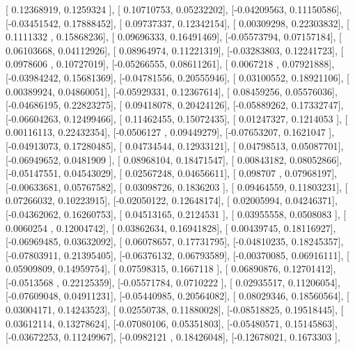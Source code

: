 \documentclass{article}
\begin{document}
       [ 0.12368919,  0.1259324 ],
       [ 0.10710753,  0.05232202],
       [-0.04209563,  0.11150586],
       [-0.03451542,  0.17888452],
       [ 0.09737337,  0.12342154],
       [ 0.00309298,  0.22303832],
       [ 0.1111332 ,  0.15868236],
       [ 0.09696333,  0.16491469],
       [-0.05573794,  0.07157184],
       [ 0.06103668,  0.04112926],
       [ 0.08964974,  0.11221319],
       [-0.03283803,  0.12241723],
       [ 0.0978606 ,  0.10727019],
       [-0.05266555,  0.08611261],
       [ 0.0067218 ,  0.07921888],
       [-0.03984242,  0.15681369],
       [-0.04781556,  0.20555946],
       [ 0.03100552,  0.18921106],
       [ 0.00389924,  0.04860051],
       [-0.05929331,  0.12367614],
       [ 0.08459256,  0.05576036],
       [-0.04686195,  0.22823275],
       [ 0.09418078,  0.20424126],
       [-0.05889262,  0.17332747],
       [-0.06604263,  0.12499466],
       [ 0.11462455,  0.15072435],
       [ 0.01247327,  0.1214053 ],
       [ 0.00116113,  0.22432354],
       [-0.0506127 ,  0.09449279],
       [-0.07653207,  0.1621047 ],
       [-0.04913073,  0.17280485],
       [ 0.04734544,  0.12933121],
       [ 0.04798513,  0.05087701],
       [-0.06949652,  0.0481909 ],
       [ 0.08968104,  0.18471547],
       [ 0.00843182,  0.08052866],
       [-0.05147551,  0.04543029],
       [ 0.02567248,  0.04656611],
       [ 0.098707  ,  0.07968197],
       [-0.00633681,  0.05767582],
       [ 0.03098726,  0.1836203 ],
       [ 0.09464559,  0.11803231],
       [ 0.07266032,  0.10223915],
       [-0.02050122,  0.12648174],
       [ 0.02005994,  0.04246371],
       [-0.04362062,  0.16260753],
       [ 0.04513165,  0.2124531 ],
       [ 0.03955558,  0.0508083 ],
       [ 0.0060254 ,  0.12004742],
       [ 0.03862634,  0.16941828],
       [ 0.00439745,  0.18116927],
       [-0.06969485,  0.03632092],
       [ 0.06078657,  0.17731795],
       [-0.04810235,  0.18245357],
       [-0.07803911,  0.21395405],
       [-0.06376132,  0.06793589],
       [-0.00370085,  0.06916111],
       [ 0.05909809,  0.14959754],
       [ 0.07598315,  0.1667118 ],
       [ 0.06890876,  0.12701412],
       [-0.0513568 ,  0.22125359],
       [-0.05571784,  0.0710222 ],
       [ 0.02935517,  0.11206054],
       [-0.07609048,  0.04911231],
       [-0.05440985,  0.20564082],
       [ 0.08029346,  0.18560564],
       [ 0.03004171,  0.14243523],
       [ 0.02550738,  0.11880028],
       [-0.08518825,  0.19518445],
       [ 0.03612114,  0.13278624],
       [-0.07080106,  0.05351803],
       [-0.05480571,  0.15145863],
       [-0.03672253,  0.11249967],
       [-0.0982121 ,  0.18426048],
       [-0.12678021,  0.1673303 ],
\end{document}
